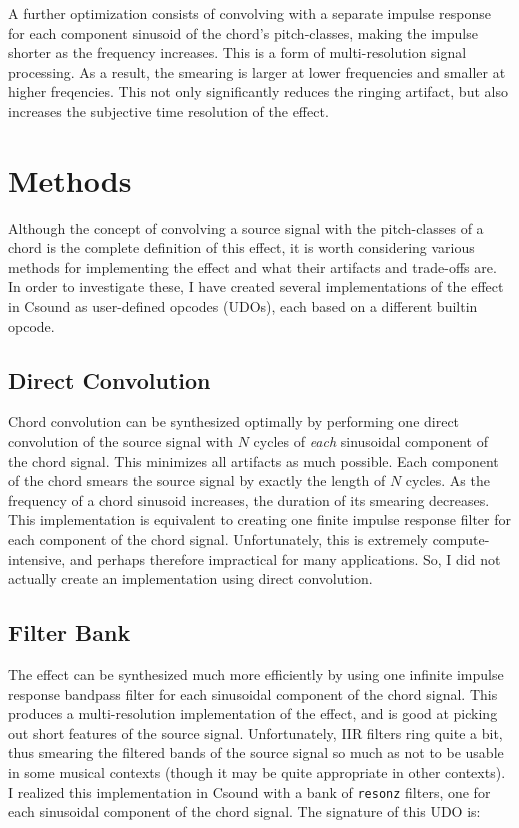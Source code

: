 \documentclass[runningheads,a4paper]{llncs}
\begin{document}
A further optimization consists of convolving with a separate impulse response 
for each component sinusoid of the chord's pitch-classes, making the impulse 
shorter as the frequency increases. This is a form of multi-resolution signal 
processing. As a result, the smearing is larger at lower frequencies and 
smaller at higher freqencies. This not only significantly reduces the ringing 
artifact, but also increases the subjective time resolution of the effect.

\section{Methods}

Although the concept of convolving a source signal with the pitch-classes of a 
chord is the complete definition of this effect, it is worth considering 
various methods for implementing the effect and what their artifacts and 
trade-offs are. In order to investigate these, I have created several 
implementations of the effect in Csound as user-defined opcodes (UDOs), each 
based on a different builtin opcode.

\subsection{Direct Convolution}
 
Chord convolution can be synthesized optimally by performing one direct 
convolution of the source signal with $N$ cycles of \emph{each} sinusoidal 
component of the chord signal. This minimizes all artifacts as much possible.  
Each component of the chord smears the source signal by exactly the length of 
$N$ cycles.  As the frequency of a chord sinusoid increases, the duration of 
its smearing decreases. This implementation is equivalent to creating one 
finite impulse response filter for each component of the chord signal. 
Unfortunately, this is extremely compute-intensive, and perhaps therefore 
impractical for many applications. So, I did not actually create an 
implementation using direct convolution.

\subsection{Filter Bank}

The effect can be synthesized much more efficiently by using one infinite 
impulse response bandpass filter for each sinusoidal component of the chord 
signal. This produces a multi-resolution implementation of the effect, and 
is good at picking out short features of the source signal. Unfortunately, IIR 
filters ring quite a bit, thus smearing the filtered bands of the source signal 
so much as not to be usable in some musical contexts (though it may be quite 
appropriate in other contexts). I realized this implementation in Csound with a 
bank of \texttt{resonz} \cite{csoundmanualresonz} filters, one for each 
sinusoidal component of the chord signal. The signature of this UDO is: 
\end{document}
